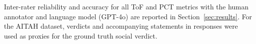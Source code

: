 Inter-rater reliability and accuracy for all ToF and PCT metrics with the human annotator and language model (GPT-4o) are reported in Section~\ref{sec:results}. For the AITAH dataset, verdicts and accompanying statements in responses were used as proxies for the ground truth social verdict.


